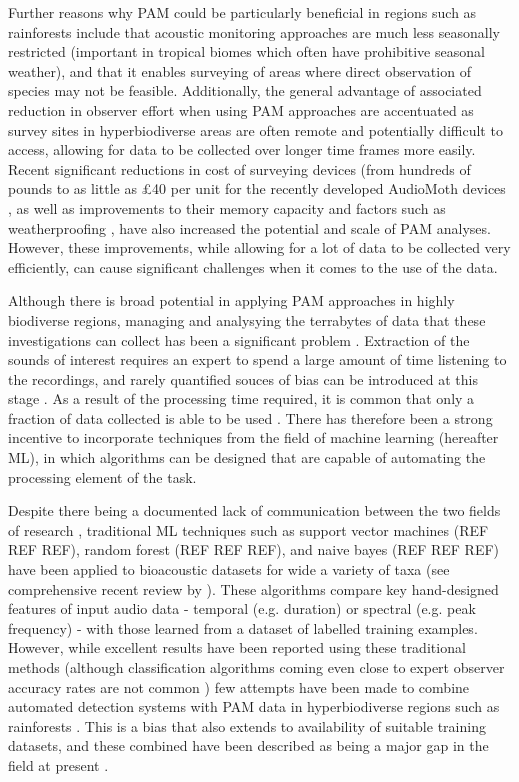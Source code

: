 \documentclass[11pt]{article}
\begin{document}
Further reasons why PAM could be particularly beneficial in regions such as rainforests include that acoustic monitoring approaches are much less seasonally restricted \citep{shonfield2017autonomous} (important in tropical biomes which often have prohibitive seasonal weather), and that it enables surveying of areas where direct observation of species may not be feasible. Additionally, the general advantage of associated reduction in observer effort when using PAM approaches \citep{digby2013practical} are accentuated as survey sites in hyperbiodiverse areas are often remote and potentially difficult to access, allowing for data to be collected over longer time frames more easily. Recent significant reductions in cost of surveying devices (from hundreds of pounds to as little as £40 per unit for the recently developed AudioMoth devices \citep{hill2018audiomoth}, as well as improvements to their memory capacity and factors such as weatherproofing \citep{fanioudakis2017deep}, have also increased the potential and scale of PAM analyses. However, these improvements, while allowing for a lot of data to be collected very efficiently, can cause significant challenges when it comes to the use of the data.

Although there is broad potential in applying PAM approaches in highly biodiverse regions, managing and analysying the terrabytes of data that these investigations can collect has been a significant problem \citep{villanueva2012pumilio,shonfield2017autonomous}. Extraction of the sounds of interest requires an expert to spend a large amount of time listening to the recordings, and rarely quantified souces of bias can be introduced at this stage \citep{digby2013practical}. As a result of the processing time required, it is common that only a fraction of data collected is able to be used \citep{kobayasi2012classification}. There has therefore been a strong incentive to incorporate techniques from the field of machine learning (hereafter ML), in which algorithms can be designed that are capable of automating the processing element of the task. 

Despite there being a documented lack of communication between the two fields of research \citep{thessen2016adoption}, traditional ML techniques such as support vector machines (REF REF REF), random forest (REF REF REF), and naive bayes (REF REF REF) have been applied to bioacoustic datasets for wide a variety of taxa (see comprehensive recent review by \cite{knight2017recommendations}). These algorithms compare key hand-designed features of input audio data - temporal (e.g. duration) or spectral (e.g. peak frequency) - with those learned from a dataset of labelled training examples. However, while excellent results have been reported using these traditional methods (although classification algorithms coming even close to expert observer accuracy rates are not common \citep{ovaskainen2018animal}) few attempts have been made to combine automated detection systems with PAM data in hyperbiodiverse regions such as rainforests \citep{browning2017passive}. This is a bias that also extends to availability of suitable training datasets, and these combined have been described as being a major gap in the field at present \citep{browning2017passive}.
\end{document}
